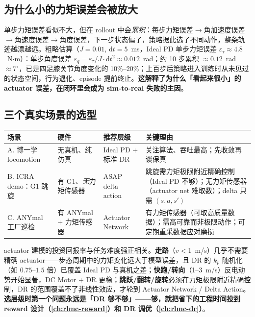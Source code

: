 \subsection{为什么小的力矩误差会被放大}
\label{sec:rlmc-act-decision-accum}

单步力矩误差看似不大，但在 rollout 中会\emph{累积}：每步力矩误差$\to$角加速度误差$\to$角速度误差$\to$角度误差，下一步状态偏了，策略据此选了不同动作，整条轨迹越漂越远。粗略估算（$J=0.01$, $\mathrm{d}t=5$~ms，Ideal PD 单步力矩误差 $\varepsilon_\tau\approx4.8$~N$\cdot$m）：单步角度误差 $\varepsilon_q=\varepsilon_\tau/J\cdot\mathrm{d}t^2\approx0.012$~rad；约 10 步累积 $\approx0.12$~rad $\approx7^\circ$，已是四足膝关节角度变化的 10\%--20\%；上百步后策略进入训练时从未见过的状态空间，行为退化、episode 提前终止。\textbf{这解释了为什么「看起来很小」的 actuator 误差，在闭环里会成为 sim-to-real 失败的主因}。

\subsection{三个真实场景的选型}
\label{sec:rlmc-act-decision-scenarios}

\begin{center}
\small
\begin{tabular}{@{}p{2.5cm}p{2.4cm}p{3.0cm}p{4.0cm}@{}}
\toprule
场景 & 硬件 & 推荐层级 & 关键理由 \\
\midrule
A. 博一学 locomotion & 无真机、纯仿真 & Ideal PD $+$ 标准 DR & 关注算法、吞吐最高；先收敛再谈保真 \\
B. ICRA demo：G1 跳旋 & 有 G1、\emph{无}力矩传感器 & ASAP delta action & 跳旋需力矩极限附近精确控制（Ideal PD 不够）；无力矩传感器（actuator net 难取数）；delta 只需 $(s,a,s')$ \\
C. ANYmal 工厂巡检 & 有 ANYmal $+$ 力矩传感器 & Actuator Network & 有力矩传感器（可取高质量数据）；需高可靠而非极限动作；可定期重采数据应对磨损 \\
\bottomrule
\end{tabular}
\end{center}

\begin{insight}\label{ins:rlmc-act-roi}
actuator 建模的投资回报率与任务难度强正相关。\textbf{走路}（$v<1$~m/s）几乎不需要精确 actuator——步态周期中的力矩变化远大于模型误差，且 DR 的 $k_p$ 随机化（如 $0.75$--$1.5$ 倍）已覆盖 Ideal PD 与真机之差；\textbf{快跑/转向}（1--3~m/s）反电动势开始显著，DC Motor $+$ DR 更稳；\textbf{跳跃/翻转/旋转}必须在力矩极限附近精确控制，DR 的范围覆盖不了非线性效应，才轮到 Actuator Network / Delta Action。\textbf{选层级时第一个问题永远是「DR 够不够」——够，就把省下的工程时间投到 reward 设计（\cref{ch:rlmc-reward}）和 DR 调优（\cref{ch:rlmc-dr}）}。
\end{insight}

